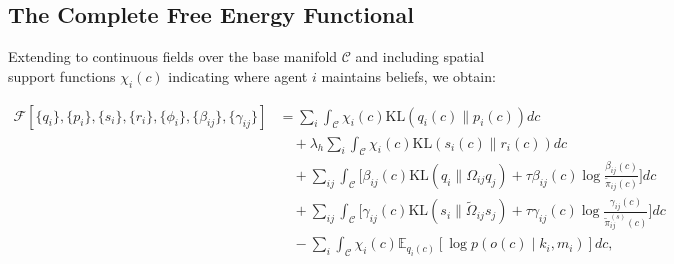 \documentclass[11pt]{article}
\begin{document}
\subsection{The Complete Free Energy Functional}
\label{sec:complete_free_energy}

Extending to continuous fields over the base manifold $\mathcal{C}$ and including spatial support functions $\chi_i(c)$ indicating where agent $i$ maintains beliefs, we obtain:

\begin{equation}
\boxed{
\begin{aligned}
\mathcal{F}[\{q_i\}, \{p_i\}, \{s_i\}, \{r_i\}, \{\phi_i\}, \{\beta_{ij}\}, \{\gamma_{ij}\}]
&= \sum_i \int_{\mathcal{C}} \chi_i(c)  \mathrm{KL}(q_i(c) \| p_i(c))  dc \\
&\quad + \lambda_h \sum_i \int_{\mathcal{C}} \chi_i(c)  \mathrm{KL}(s_i(c) \| r_i(c))  dc \\
&\quad + \sum_{ij} \int_{\mathcal{C}} \Big[\beta_{ij}(c)  \mathrm{KL}(q_i \| \Omega_{ij} q_j) + \tau \beta_{ij}(c) \log\tfrac{\beta_{ij}(c)}{\tilde{\pi}_{ij}(c)}\Big] dc \\
&\quad + \sum_{ij} \int_{\mathcal{C}} \Big[\gamma_{ij}(c)  \mathrm{KL}(s_i \| \tilde{\Omega}_{ij} s_j) + \tau \gamma_{ij}(c) \log\tfrac{\gamma_{ij}(c)}{\tilde{\pi}^{(s)}_{ij}(c)}\Big] dc \\
&\quad - \sum_i \int_{\mathcal{C}} \chi_i(c)  \mathbb{E}_{q_i(c)}[\log p(o(c) \mid k_i, m_i)]  dc,
\end{aligned}
}
\label{eq:free_energy_functional_final}
\end{equation}
\end{document}
